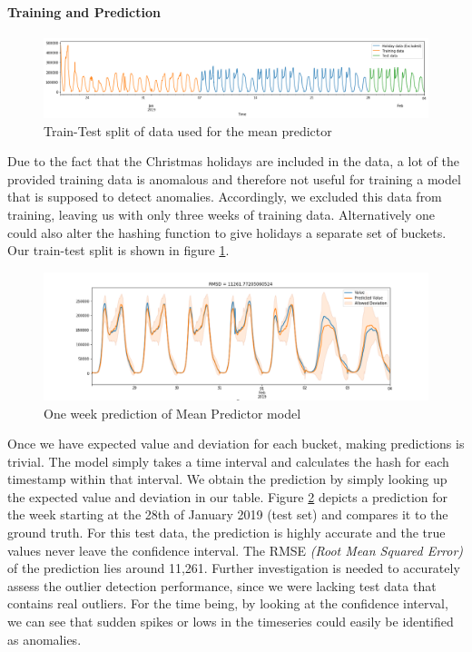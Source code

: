 \paragraph{Training and Prediction}
\begin{figure}[h]
    \centering
    \includegraphics[width=1\textwidth]{images/mean_pred_training_data.png}
    \caption{Train-Test split of data used for the mean predictor}
    \label{fig:mean_predictor_training_data}
\end{figure}
Due to the fact that the Christmas holidays are included in the data, a lot of the provided training data is anomalous and therefore not useful for training a model that is supposed to detect anomalies. Accordingly, we excluded this data from training, leaving us with only three weeks of training data. Alternatively one could also alter the hashing function to give holidays a separate set of buckets. Our train-test split is shown in figure \ref{fig:mean_predictor_training_data}.

\begin{figure}
    \centering
    \includegraphics[width=1\textwidth]{images/mean_pred_test.png}
    \caption{One week prediction of Mean Predictor model}
    \label{fig:mean_predictor_prediction}
\end{figure}

Once we have expected value and deviation for each bucket, making predictions is trivial. The model simply takes a time interval and calculates the hash for each timestamp within that interval. We obtain the prediction by simply looking up the expected value and deviation in our table. Figure \ref{fig:mean_predictor_prediction} depicts a prediction for the week starting at the 28th of January 2019 (test set) and compares it to the ground truth. For this test data, the prediction is highly accurate and the true values never leave the confidence interval. The RMSE \textit{(Root Mean Squared Error)} of the prediction lies around 11,261. Further investigation is needed to accurately assess the outlier detection performance, since we were lacking test data that contains real outliers. For the time being, by looking at the confidence interval, we can see that sudden spikes or lows in the timeseries could easily be identified as anomalies.
\pagebreak

